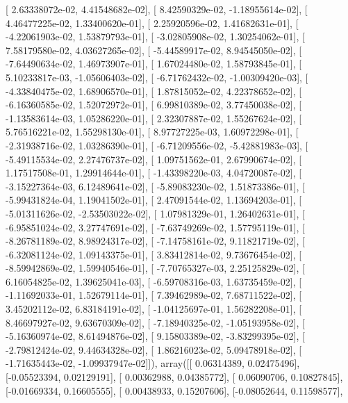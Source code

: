 \documentclass{article}
\begin{document}
       [  2.63338072e-02,   4.41548682e-02],
       [  8.42590329e-02,  -1.18955614e-02],
       [  4.46477225e-02,   1.33400620e-01],
       [  2.25920596e-02,   1.41682631e-01],
       [ -4.22061903e-02,   1.53879793e-01],
       [ -3.02805908e-02,   1.30254062e-01],
       [  7.58179580e-02,   4.03627265e-02],
       [ -5.44589917e-02,   8.94545050e-02],
       [ -7.64490634e-02,   1.46973907e-01],
       [  1.67024480e-02,   1.58793845e-01],
       [  5.10233817e-03,  -1.05606403e-02],
       [ -6.71762432e-02,  -1.00309420e-03],
       [ -4.33840475e-02,   1.68906570e-01],
       [  1.87815052e-02,   4.22378652e-02],
       [ -6.16360585e-02,   1.52072972e-01],
       [  6.99810389e-02,   3.77450038e-02],
       [ -1.13583614e-03,   1.05286220e-01],
       [  2.32307887e-02,   1.55267624e-02],
       [  5.76516221e-02,   1.55298130e-01],
       [  8.97727225e-03,   1.60972298e-01],
       [ -2.31938716e-02,   1.03286390e-01],
       [ -6.71209556e-02,  -5.42881983e-03],
       [ -5.49115534e-02,   2.27476737e-02],
       [  1.09751562e-01,   2.67990674e-02],
       [  1.17517508e-01,   1.29914644e-01],
       [ -1.43398220e-03,   4.04720087e-02],
       [ -3.15227364e-03,   6.12489641e-02],
       [ -5.89083230e-02,   1.51873386e-01],
       [ -5.99431824e-04,   1.19041502e-01],
       [  2.47091544e-02,   1.13694203e-01],
       [ -5.01311626e-02,  -2.53503022e-02],
       [  1.07981329e-01,   1.26402631e-01],
       [ -6.95851024e-02,   3.27747691e-02],
       [ -7.63749269e-02,   1.57795119e-01],
       [ -8.26781189e-02,   8.98924317e-02],
       [ -7.14758161e-02,   9.11821719e-02],
       [ -6.32081124e-02,   1.09143375e-01],
       [  3.83412814e-02,   9.73676454e-02],
       [ -8.59942869e-02,   1.59940546e-01],
       [ -7.70765327e-03,   2.25125829e-02],
       [  6.16054825e-02,   1.39625041e-03],
       [ -6.59708316e-03,   1.63735459e-02],
       [ -1.11692033e-01,   1.52679114e-01],
       [  7.39462989e-02,   7.68711522e-02],
       [  3.45202112e-02,   6.83184191e-02],
       [ -1.04125697e-01,   1.56282208e-01],
       [  8.46697927e-02,   9.63670309e-02],
       [ -7.18940325e-02,  -1.05193958e-02],
       [ -5.16360974e-02,   8.61494876e-02],
       [  9.15803389e-02,  -3.83299395e-02],
       [ -2.79812424e-02,   9.44634328e-02],
       [  1.86216023e-02,   5.09478918e-02],
       [ -1.71635443e-02,  -1.09937947e-02]]), array([[ 0.06314389,  0.02475496],
       [-0.05523394,  0.02129191],
       [ 0.00362988,  0.04385772],
       [ 0.06090706,  0.10827845],
       [-0.01669334,  0.16605555],
       [ 0.00438933,  0.15207606],
       [-0.08052644,  0.11598577],
\end{document}
